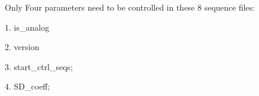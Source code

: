Only Four parameters need to be controlled in these 8 sequence files: 

1. is_analog %

2. version

3. start_ctrl_seqs; %

4. SD_coeff; %

